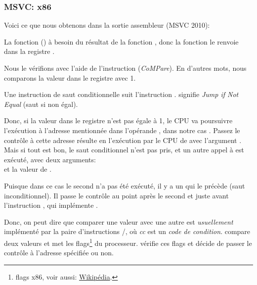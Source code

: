\subsubsection{MSVC: x86}

Voici ce que nous obtenons dans la sortie assembleur (MSVC 2010):



La fonction  (\main) à besoin du résultat de la fonction
, donc la fonction  le renvoie
dans la registre \EAX.

Nous le vérifions avec l'aide de l'instruction  (\emph{CoMPare}).
En d'autres mots, nous comparons la valeur dans le registre \EAX avec 1.

Une instruction de saut conditionnelle \JNE suit l'instruction \CMP. \JNE signifie
\emph{Jump if Not Equal} (saut si non égal).

Donc, si la valeur dans le registre \EAX n'est pas égale à 1, le \ac{CPU} va poursuivre
l'exécution à l'adresse mentionnée dans l'opérande \JNE, dans notre cas .
Passez le contrôle à cette adresse résulte en l'exécution par le \ac{CPU} de
\printf avec l'argument .
Mais si tout est bon, le saut conditionnel n'est pas pris, et un autre appel à \printf
est exécuté, avec deux arguments:\\
 et la valeur de .

Puisque dans ce cas le second \printf n'a pas été exécuté, il y a un \JMP qui le précède (saut inconditionnel).
Il passe le contrôle au point après le second \printf et juste avant l'instruction , qui implémente .

Donc, on peut dire que comparer une valeur avec une autre est \emph{usuellement} implémenté
par la paire d'instructions \CMP/\Jcc, où \emph{cc} est un \emph{code de condition}.
\CMP compare deux valeurs et met les flags\footnote{flags x86, voir aussi: \href{http://en.wikipedia.org/wiki/FLAGS_register_(computing)}{Wikipédia}.}
du processeur.
\Jcc vérifie ces flags et décide de passer le contrôle à l'adresse spécifiée ou non.

